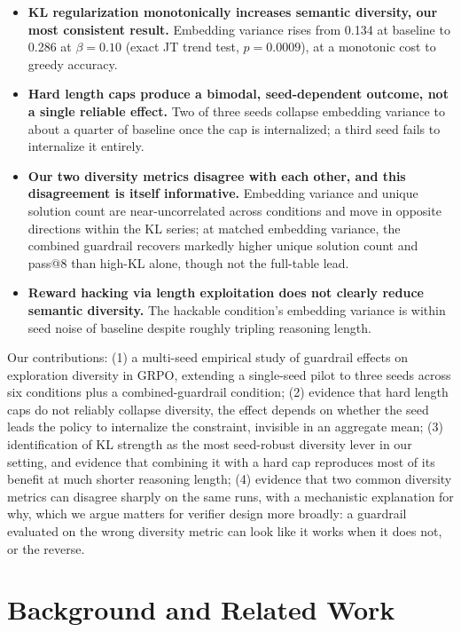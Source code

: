 \documentclass{article}
\begin{document}
\begin{itemize}[leftmargin=*,itemsep=1pt]
    \item \textbf{KL regularization monotonically increases semantic diversity, our most consistent result.} Embedding variance rises from 0.134 at baseline to 0.286 at $\beta=0.10$ (exact JT trend test, $p=0.0009$), at a monotonic cost to greedy accuracy.
    \item \textbf{Hard length caps produce a bimodal, seed-dependent outcome, not a single reliable effect.} Two of three seeds collapse embedding variance to about a quarter of baseline once the cap is internalized; a third seed fails to internalize it entirely.
    \item \textbf{Our two diversity metrics disagree with each other, and this disagreement is itself informative.} Embedding variance and unique solution count are near-uncorrelated across conditions and move in opposite directions within the KL series; at matched embedding variance, the combined guardrail recovers markedly higher unique solution count and pass@8 than high-KL alone, though not the full-table lead.
    \item \textbf{Reward hacking via length exploitation does not clearly reduce semantic diversity.} The hackable condition's embedding variance is within seed noise of baseline despite roughly tripling reasoning length.
\end{itemize}

Our contributions: (1) a multi-seed empirical study of guardrail effects on exploration diversity in GRPO, extending a single-seed pilot to three seeds across six conditions plus a combined-guardrail condition; (2) evidence that hard length caps do not reliably collapse diversity, the effect depends on whether the seed leads the policy to internalize the constraint, invisible in an aggregate mean; (3) identification of KL strength as the most seed-robust diversity lever in our setting, and evidence that combining it with a hard cap reproduces most of its benefit at much shorter reasoning length; (4) evidence that two common diversity metrics can disagree sharply on the same runs, with a mechanistic explanation for why, which we argue matters for verifier design more broadly: a guardrail evaluated on the wrong diversity metric can look like it works when it does not, or the reverse.

\section{Background and Related Work}
\end{document}

